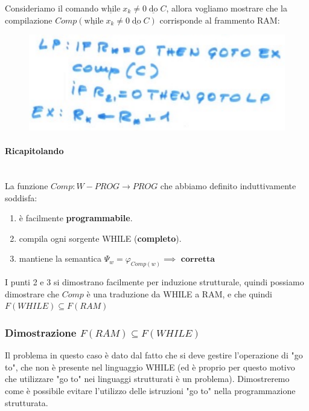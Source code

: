 \documentclass{article}
\begin{document}
\begin{itemize}
          Consideriamo il comando $\underline{\text{while}}\;x_k\neq 0\;\underline{\text{do}}\; C$,
          allora vogliamo mostrare che la compilazione $Comp(\underline{\text{while}}\;x_k\neq 0\;\underline{\text{do}}\; C)$
          corrisponde al frammento RAM:
          \begin{figure}[H]
              \centering
              \includegraphics[scale=0.5]{images/comandowhile_ram.png}
          \end{figure}

          \paragraph{Ricapitolando}\mbox{}\\
          La funzione $Comp:W-PROG\rightarrow PROG$ che abbiamo definito induttivamente soddisfa:
          \begin{enumerate}
              \item è facilmente \textbf{programmabile}.
              \item compila ogni sorgente WHILE (\textbf{completo}).
              \item mantiene la semantica $\Psi_w=\varphi_{Comp(w)}\implies\textbf{ corretta}$
          \end{enumerate}
          I punti 2 e 3 si dimostrano facilmente per induzione strutturale, quindi possiamo dimostrare
          che $Comp$ è una traduzione da WHILE a RAM, e che quindi $F(WHILE)\subseteq F(RAM)$

\end{itemize}

\subsubsection{Dimostrazione $F(RAM)\subseteq F(WHILE)$}
Il problema in questo caso è dato dal fatto che si deve gestire l'operazione di "go to", che non
è presente nel linguaggio WHILE (ed è proprio per questo motivo che utilizzare
"go to" nei linguaggi strutturati è un problema). Dimostreremo come è possibile evitare l'utilizzo
delle istruzioni "go to" nella programmazione strutturata.
\end{document}
